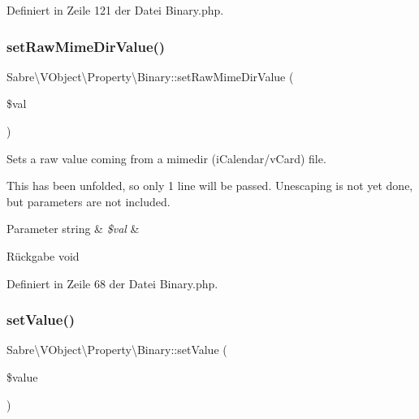 Definiert in Zeile 121 der Datei Binary.\+php.

\mbox{\label{class_sabre_1_1_v_object_1_1_property_1_1_binary_ac1b4d53f37a78815d7205e6c1eff3e19}} 
\subsubsection{\texorpdfstring{set\+Raw\+Mime\+Dir\+Value()}{setRawMimeDirValue()}}
{\footnotesize\ttfamily Sabre\textbackslash{}\+V\+Object\textbackslash{}\+Property\textbackslash{}\+Binary\+::set\+Raw\+Mime\+Dir\+Value (\begin{DoxyParamCaption}\item[{}]{\$val }\end{DoxyParamCaption})}

Sets a raw value coming from a mimedir (i\+Calendar/v\+Card) file.

This has been \textquotesingle{}unfolded\textquotesingle{}, so only 1 line will be passed. Unescaping is not yet done, but parameters are not included.


\begin{DoxyParams}[1]{Parameter}
string & {\em \$val} & \\
\hline
\end{DoxyParams}
\begin{DoxyReturn}{Rückgabe}
void 
\end{DoxyReturn}


Definiert in Zeile 68 der Datei Binary.\+php.

\mbox{\label{class_sabre_1_1_v_object_1_1_property_1_1_binary_a39ac950bc47a3f0ffed4a9f10ad2c972}} 
\subsubsection{\texorpdfstring{set\+Value()}{setValue()}}
{\footnotesize\ttfamily Sabre\textbackslash{}\+V\+Object\textbackslash{}\+Property\textbackslash{}\+Binary\+::set\+Value (\begin{DoxyParamCaption}\item[{}]{\$value }\end{DoxyParamCaption})}

